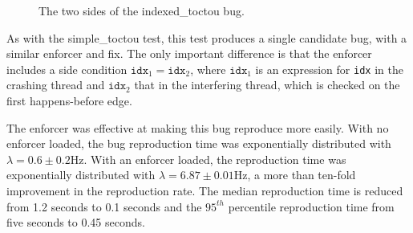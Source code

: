\begin{figure}
  \caption{The two sides of the indexed\_toctou bug.}
  \label{fig:eval:indexed_toctou}
\end{figure}

As with the simple\_toctou test, this test produces a single candidate
bug, with a similar enforcer and fix.  The only important difference
is that the enforcer includes a side condition $\mathtt{idx}_1 =
\mathtt{idx}_2$, where $\mathtt{idx}_1$ is an expression for
\texttt{idx} in the crashing thread and $\mathtt{idx}_2$ that in the
interfering thread, which is checked on the first happens-before edge.

The enforcer was effective at making this bug reproduce more easily.
With no enforcer loaded, the bug reproduction time was exponentially
distributed with $\lambda = 0.6 \pm 0.2$Hz.  With an enforcer loaded,
the reproduction time was exponentially distributed with $\lambda =
6.87 \pm 0.01$Hz, a more than ten-fold improvement in the reproduction
rate.  The median reproduction time is reduced from 1.2 seconds to 0.1
seconds and the $95^{th}$ percentile reproduction time from five
seconds to 0.45 seconds.  

